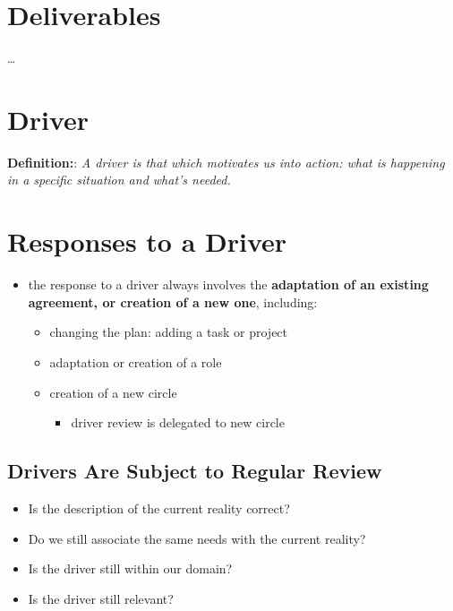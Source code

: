 \section{Deliverables}
\label{deliverables}

{\ldots}

\section{Driver}
\label{driver}

\textbf{Definition:}: \emph{A driver is that which motivates us into action: what is happening in a specific situation and what’s needed.}

\section{Responses to a Driver}
\label{responsestoadriver}

\begin{itemize}
\item the response to a driver always involves the \textbf{adaptation of an existing agreement, or creation of a new one}, including:

\begin{itemize}
\item changing the plan: adding a task or project

\item adaptation or creation of a role

\item creation of a new circle

\begin{itemize}
\item driver review is delegated to new circle

\end{itemize}

\end{itemize}

\end{itemize}

\subsection{Drivers Are Subject to Regular Review}
\label{driversaresubjecttoregularreview}

\begin{itemize}
\item Is the description of the current reality correct?

\item Do we still associate the same needs with the current reality?

\item Is the driver still within our domain?

\item Is the driver still relevant?

\end{itemize}

